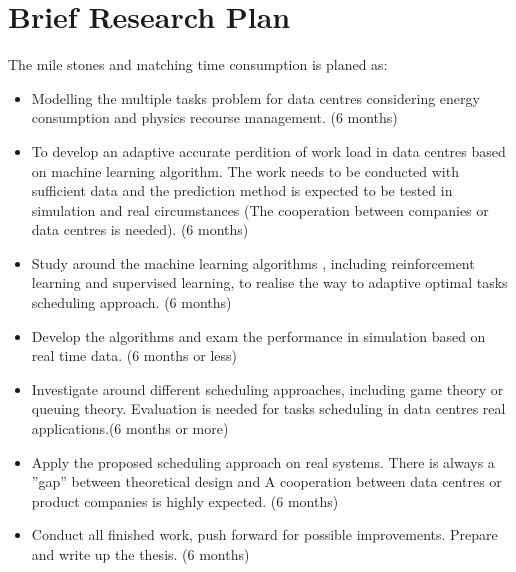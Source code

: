 \section{Brief Research Plan}\label{sec:timetable}
The mile stones and matching time consumption is planed as:
\begin{itemize}
\item
Modelling the multiple tasks problem for data centres considering energy consumption and physics recourse management. (6 months)
\item
To develop an adaptive accurate perdition of work load in data centres based on machine learning algorithm. The work needs to be conducted with sufficient data and the prediction method is expected to be tested in simulation and real circumstances (The cooperation between companies or data centres is needed). (6 months)
\item
Study around the machine learning algorithms \cite{ma}, including reinforcement learning and supervised learning, to realise the way to adaptive optimal tasks scheduling approach. (6 months)
\item
Develop the algorithms and exam the performance in simulation based on real time data. (6 months or less)
\item
Investigate around different scheduling approaches, including game theory or queuing theory. Evaluation is needed for tasks scheduling in data centres real applications.(6 months or more)
\item
Apply the proposed scheduling approach on real systems. There is always a ”gap” between theoretical design and A cooperation between data centres or product companies is highly expected. (6 months)
\item
Conduct all finished work, push forward for possible improvements. Prepare and write up the thesis. (6 months)
\end{itemize}